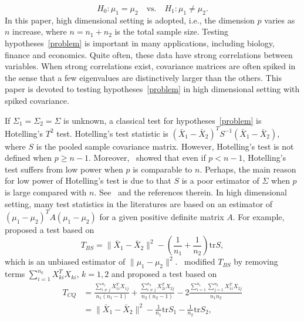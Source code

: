\documentclass[review]{elsarticle}
\theoremstyle{plain}
\theoremstyle{definition}
\theoremstyle{remark}
\begin{document}
\begin{equation}\label{problem}
    H_0:\mu_1=\mu_2\quad \textrm{vs.}\quad H_1:\mu_1\neq \mu_2.
\end{equation}
 In this paper, high dimensional setting is adopted, i.e., the dimension $p$ varies as $n$ increase, where $n=n_1+n_2$ is the total sample size.
Testing hypotheses~\eqref{problem} is important in many applications, including biology, finance and economics.
Quite often,  these data have strong correlations between variables.
When strong correlations exist, covariance matrices are often spiked in the sense that a few eigenvalues are distinctively larger than the others.
This paper is devoted to
testing hypotheses~\eqref{problem} in high dimensional setting with spiked covariance.


If $\Sigma_1=\Sigma_2=\Sigma$ is unknown, a classical test for hypotheses~\eqref{problem} is Hotelling's $T^2$ test.  Hotelling's test statistic is ${(\bar{X}_1-\bar{X}_2)}^T S^{-1}(\bar{X}_1-\bar{X}_2)$, where $S$ is the pooled sample covariance matrix. However, Hotelling's test is not defined when $p\geq n-1$.
Moreover,~\cite{Bai1996Efiect} showed that even if $p<n-1$, Hotelling's test suffers from low power when $p$ is comparable to $n$.
Perhaps, the main reason for low power of Hotelling's test is due to that $S$ is a poor estimator of $\Sigma$ when $p$ is large compared with $n$. See~\cite{Chen2010A} and the references therein.
In high dimensional setting,  
many test statistics in the literatures are based on an estimator of ${(\mu_1-\mu_2)}^T A(\mu_1-\mu_2)$ for a given positive definite matrix $A$. 
For example,~\cite{Bai1996Efiect} proposed a test based on
\begin{equation*}
    T_{BS}=\|\bar{X}_1-\bar{X}_2\|^2-(\frac{1}{n_1}+\frac{1}{n_2})\mathrm{tr}S,
\end{equation*}
which is an unbiased estimator of $\|\mu_1-\mu_2\|^2$.~\cite{Chen2010A} modified $T_{BS}$ by removing terms $\sum_{i=1}^{n_k}X_{ki}^T X_{ki}$, $k=1,2$ and proposed a test based on
\begin{equation*}
    \begin{aligned}
        T_{CQ}&=\frac{\sum_{i\neq j}^{n_1}X_{1i}^T X_{1j}}{n_1(n_1-1)}+\frac{\sum_{i\neq j}^{n_2}X_{2i}^T X_{2j}}{n_2(n_2-1)}-2\frac{\sum_{i=1}^{n_1}\sum_{j=1}^{n_2}X_{1i}^T X_{2j}}{n_1n_2}
        \\
            &=\|\bar{X}_1-\bar{X}_2\|^2-\frac{1}{n_1}\mathrm{tr}S_1-\frac{1}{n_2}\mathrm{tr}S_2,
    \end{aligned}
\end{equation*}
\end{document}
